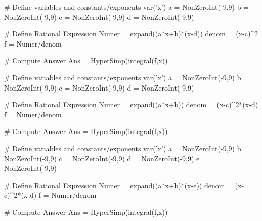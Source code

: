 \begin{sagesilent}
# Define variables and constants/exponents
var('x')
a = NonZeroInt(-9,9)
b = NonZeroInt(-9,9)
c = NonZeroInt(-9,9)
d = NonZeroInt(-9,9)

# Define Rational Expression
Numer = expand((a*x+b)*(x-d))
denom = (x-c)^2
f = Numer/denom

# Compute Answer
Ans = HyperSimp(integral(f,x))
\end{sagesilent}




\begin{sagesilent}
# Define variables and constants/exponents
var('x')
a = NonZeroInt(-9,9)
b = NonZeroInt(-9,9)
c = NonZeroInt(-9,9)
d = NonZeroInt(-9,9)

# Define Rational Expression
Numer = expand((a*x+b))
denom = (x-c)^2*(x-d)
f = Numer/denom

# Compute Answer
Ans = HyperSimp(integral(f,x))
\end{sagesilent}


\begin{sagesilent}
# Define variables and constants/exponents
var('x')
a = NonZeroInt(-9,9)
b = NonZeroInt(-9,9)
c = NonZeroInt(-9,9)
d = NonZeroInt(-9,9)
e = NonZeroInt(-9,9)

# Define Rational Expression
Numer = expand((a*x+b)*(x-e))
denom = (x-c)^2*(x-d)
f = Numer/denom

# Compute Answer
Ans = HyperSimp(integral(f,x))
\end{sagesilent}

